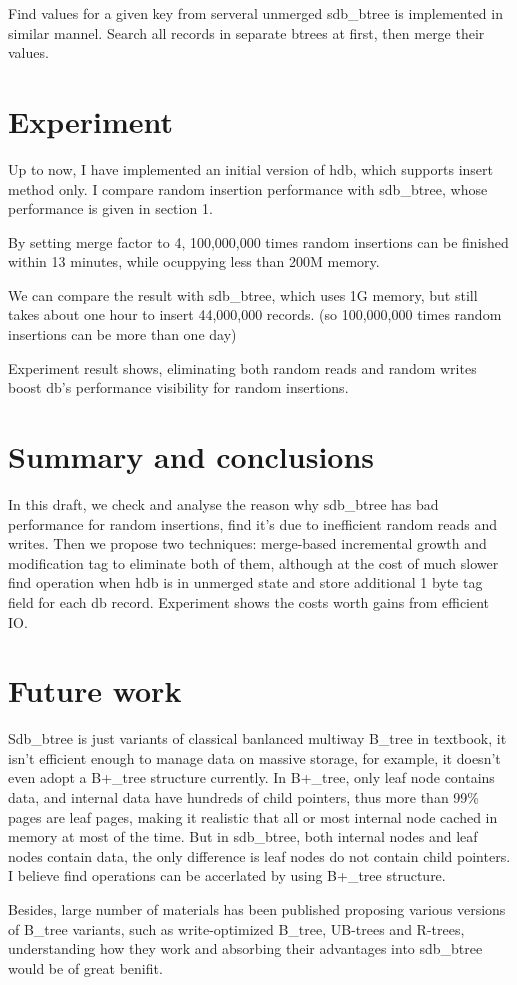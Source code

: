 \documentclass[a4paper,10pt]{article}
\begin{document}
Find values for a given key from serveral unmerged sdb\_btree is implemented in similar mannel. Search all records in separate btrees at first, then merge their values.

\section{Experiment}

Up to now, I have implemented an initial version of hdb, which supports insert method only. I compare random insertion performance with sdb\_btree, whose performance is given in section 1.

By setting merge factor to 4, 100,000,000 times random insertions can be finished within 13 minutes, while ocuppying less than 200M memory.

We can compare the result with sdb\_btree, which uses 1G memory, but still takes about one hour to insert 44,000,000 records. (so 100,000,000 times random insertions can be more than one day)

Experiment result shows, eliminating both random reads and random writes boost db's performance visibility for random insertions.

\section{Summary and conclusions}

In this draft, we check and analyse the reason why sdb\_btree has bad performance for random insertions, find it's due to inefficient random reads and writes.
Then we propose two techniques: merge-based incremental growth and modification tag to eliminate both of them, although at the cost of much slower find operation when hdb is in unmerged state
and store additional 1 byte tag field for each db record. Experiment shows the costs worth gains from efficient IO.

\section{Future work}

Sdb\_btree is just variants of classical banlanced multiway B\_tree in textbook, it isn't efficient enough to manage data on massive storage,
for example, it doesn't even adopt a B+\_tree structure currently. In B+\_tree, only leaf node contains data, and internal data have hundreds of child pointers,
thus more than 99\% pages are leaf pages, making it realistic that all or most internal node cached in memory at most of the time.
But in sdb\_btree, both internal nodes and leaf nodes contain data, the only difference is leaf nodes do not contain child pointers.
I believe find operations can be accerlated by using B+\_tree structure.

Besides, large number of materials has been published proposing various versions of B\_tree variants, such as write-optimized B\_tree, UB-trees and R-trees, understanding how they work and absorbing
their advantages into sdb\_btree would be of great benifit.
\end{document}
